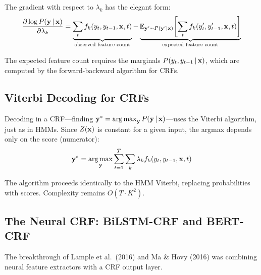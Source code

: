 The gradient with respect to $\lambda_k$ has the elegant form:
\begin{equation}
\frac{\partial \log P(\mathbf{y} \,|\, \mathbf{x})}{\partial \lambda_k}
= \underbrace{\sum_t f_k(y_t, y_{t-1}, \mathbf{x}, t)}_{\text{observed feature count}}
- \underbrace{\operatorname{\mathbb{E}}_{\mathbf{y}' \sim P(\mathbf{y}' | \mathbf{x})}\!\left[\sum_t f_k(y'_t, y'_{t-1}, \mathbf{x}, t)\right]}_{\text{expected feature count}}
\label{eq:crf_gradient}
\end{equation}

The expected feature count requires the marginals $P(y_t, y_{t-1} \,|\, \mathbf{x})$,
which are computed by the forward-backward algorithm for CRFs.

\subsection{Viterbi Decoding for CRFs}

Decoding in a CRF---finding $\mathbf{y}^* = \operatorname*{arg\,max}_{\mathbf{y}} P(\mathbf{y} \,|\, \mathbf{x})$---uses
the Viterbi algorithm, just as in HMMs.  Since $Z(\mathbf{x})$ is constant for a
given input, the argmax depends only on the score (numerator):
\begin{equation}
\mathbf{y}^* = \operatorname*{arg\,max}_{\mathbf{y}} \sum_{t=1}^{T} \sum_{k} \lambda_k f_k(y_t, y_{t-1}, \mathbf{x}, t)
\end{equation}

The algorithm proceeds identically to the HMM Viterbi, replacing
probabilities with scores.  Complexity remains $O(T \cdot K^2)$.

\subsection{The Neural CRF: BiLSTM-CRF and BERT-CRF}
\label{sec:neural_crf}

The breakthrough of Lample et al.\ (2016) and Ma \& Hovy (2016) was combining
neural feature extractors with a CRF output layer.

